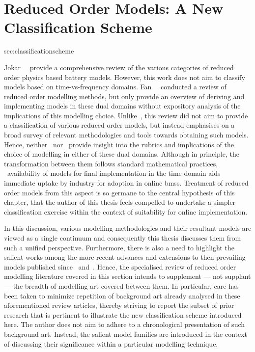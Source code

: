 \section{Reduced Order Models: A New Classification Scheme}{sec:classificationscheme}

Jokar~\etal~\cite{Jokar2016}  provide  a  comprehensive review  of  the  various
categories  of  reduced  order  physics  based  battery  models.  However,  this
work  does  not aim  to  classify  models  based on  time-vs-frequency  domains.
Fan~\etal{}~\cite{Fan2015}  conducted  a  review   of  reduced  order  modelling
methods, but  only provide an  overview of  deriving and implementing  models in
these  dual domains  without expository  analysis  of the  implications of  this
modelling choice. Unlike~\cite{Jokar2016}, this review  did not aim to provide a
classification  of various  reduced order  models, but  instead emphasises  on a
broad survey of relevant methodologies  and tools towards obtaining such models.
Hence,  neither~\cite{Jokar2016}  nor~\cite{Fan2015}  provide insight  into  the
rubrics and  implications of  the choice  of modelling in  either of  these dual
domains. Although in principle, the transformation between them follows standard
mathematical  practices, ~availability of  models for
final implementation  in the time domain  aids immediate uptake by  industry for
adoption  in online  \gls{bms}s. Treatment  of  reduced order  models from  this
aspect  is so  germane to  the central  hypothesis of  this chapter, that  the author  of this  thesis feels
compelled to undertake  a simpler classification exercise within  the context of
suitability for online implementation.


In this discussion,  various modelling methodologies and  their resultant models
are viewed  as a single  continuum and  consequently this thesis  discusses them
from such a unified perspective. Furthermore,  there is also a need to highlight
the  salient  works among  the  more  recent  advances  and extensions  to  then
prevailing  models published  since~\cite{Jokar2016} and~\cite{Fan2015}.  Hence,
the specialised  review of  reduced order modelling  literature covered  in this
section intends to supplement --- not  supplant --- the breadth of modelling art
covered between them. In particular, care  has been taken to minimize repetition
of  background art  already analysed  in these  aforementioned review  articles,
thereby striving  to report the  subset of prior  research that is  pertinent to
illustrate the  new classification scheme  introduced here. The author  does not
aim to adhere  to a chronological presentation of such  background art. Instead,
the salient  model families are  introduced in  the context of  discussing their
significance within a particular modelling technique.



